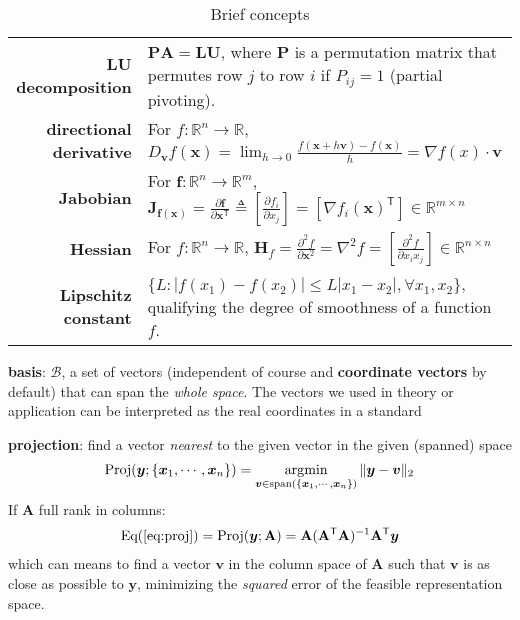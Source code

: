 \begin{table}[htpb]
\begin{tabular}{rp{24em}}
        \textbf{LU decomposition}                       & $\mathbf{PA}=\mathbf{LU}$, where $\mathbf{P}$ is a permutation matrix that permutes row $j$ to row $i$ if $P_{ij}=1$ (partial pivoting).\\
        \textbf{directional derivative}                 & {\footnotesize For $f:\mathbb{R}^n\to\mathbb{R}$, 
        $D_{\bm{v}}f(\bm{x})=\lim_{h\to 0}\frac{f(\bm{x}+h\bm{v})-f(\bm{x})}{h}=\nabla f(x)\cdot \bm{v}$} \\
        \textbf{Jabobian}                               & {\footnotesize For $\bm{f}:\mathbb{R}^n\to\mathbb{R}^m$,
        $\mathbf{J}_{\bm{f}(\bm{x})}
        = \frac{\partial{\bm{f}}}{\partial{\bm{x}^\mathsf{T}}}
        \triangleq\left[\frac{\partial{f_i}}{\partial{x_j}}\right]
        = \left[\nabla f_i(\bm{x})^\mathsf{T}\right]\in\mathbb{R}^{m\times n}$} \\
        \textbf{Hessian}                                & {\footnotesize For $f:\mathbb{R}^n\to\mathbb{R}$,
        $\mathbf{H}_f=\frac{\partial^2 f}{\partial\bm{x}^2}=\nabla^2 f=\left[\frac{\partial^2 f}{\partial x_ix_j}\right]\in\mathbb{R}^{n\times n}$}\\
        \textbf{Lipschitz constant}                     & $\{L:|f(x_1)-f(x_2)|\leq{L}|x_1-x_2|,\forall{x_1,x_2}\}$, qualifying the degree of smoothness of a function $f$. \\
        \bottomrule
    \end{tabular}
    \caption{Brief concepts}
    \label{tab:linalg}
\end{table}




\textbf{basis}:
$\mathcal{B}$, a set of vectors (independent of course and \textbf{coordinate vectors} by default) 
that can span the \textit{whole space}.
The vectors we used in theory or application can be interpreted as the real coordinates in a standard  



\textbf{projection}: find a vector \textit{nearest} to the given vector in the given (spanned) space
\begin{gather}
    \text{Proj}(\bm{y};\{\bm{x}_1,\cdots,\bm{x}_n\})
    =\operatorname*{\arg\!min}_{\bm{v}\in\text{span}(\{\bm{x}_1,\cdots,\bm{x}_n\})}\|\bm{y}-\bm{v}\|_2\label{eq:proj}
\end{gather}
If $\mathbf{A}$ full rank in columns:
\begin{gather}
    \mathrm{Eq(\ref{eq:proj})}=\text{Proj}(\bm{y};\mathbf{A})
    =\mathbf{A}(\mathbf{A}^\mathsf{T}\mathbf{A})^{-1}\mathbf{A}^\mathsf{T}\bm{y}
\end{gather}
which can means to find a vector $\bm{v}$ in the column space of $\mathbf{A}$ 
such that $\bm{v}$ is as close as possible to $\bm{y}$,
minimizing the \textit{squared} error of the feasible representation space.

